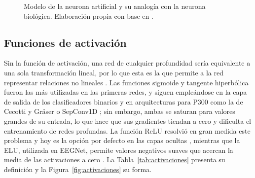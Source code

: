 \begin{figure}[htbp]
\centering
{}
\caption{Modelo de la neurona artificial y su analogía con la neurona biológica. Elaboración
propia con base en \cite{aggarwal2018}.}
\label{fig:neurona}
\end{figure}

\subsection{Funciones de activación}

Sin la función de activación, una red de cualquier profundidad sería equivalente a una sola
transformación lineal, por lo que esta es la que permite a la red representar relaciones no
lineales \cite{goodfellow2016}. Las funciones sigmoide y tangente hiperbólica fueron las más
utilizadas en las primeras redes, y siguen empleándose en la capa de salida de los clasificadores
binarios y en arquitecturas para P300 como la de Cecotti y Gräser o SepConv1D
\cite{cecotti2011,alvarado2021}; sin embargo, ambas se saturan para valores grandes de su
entrada, lo que hace que sus gradientes tiendan a cero y dificulta el entrenamiento de redes
profundas. La función ReLU resolvió en gran medida este problema y hoy es la opción por defecto en
las capas ocultas \cite{goodfellow2016}, mientras que la ELU, utilizada en EEGNet, permite valores
negativos suaves que acercan la media de las activaciones a cero \cite{lawhern2018}. La
Tabla~\ref{tab:activaciones} presenta su definición y la Figura~\ref{fig:activaciones} su forma.

